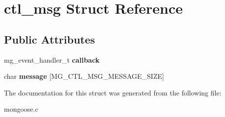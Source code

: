\hypertarget{structctl__msg}{}\section{ctl\+\_\+msg Struct Reference}
\label{structctl__msg}
\subsection*{Public Attributes}
\begin{DoxyCompactItemize}
\item 
\mbox{\label{structctl__msg_a62d9f57eca85bcecf123ae9046d97972}} 
mg\+\_\+event\+\_\+handler\+\_\+t {\bfseries callback}
\item 
\mbox{\label{structctl__msg_a07e117d1bf333976cd03507b0c1538b0}} 
char {\bfseries message} \mbox{[}M\+G\+\_\+\+C\+T\+L\+\_\+\+M\+S\+G\+\_\+\+M\+E\+S\+S\+A\+G\+E\+\_\+\+S\+I\+ZE\mbox{]}
\end{DoxyCompactItemize}


The documentation for this struct was generated from the following file\+:\begin{DoxyCompactItemize}
\item 
mongoose.\+c\end{DoxyCompactItemize}
